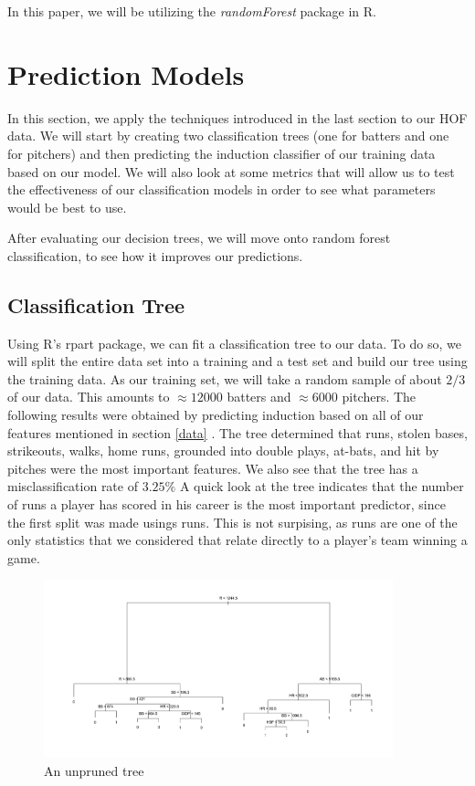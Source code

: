 \documentclass[preprint,12pt]{elsarticle}
\begin{document}
In this paper, we will be utilizing the \textit{randomForest} package in R. 

\section{Prediction Models}

In this section, we apply the techniques introduced in the last section to our HOF data. We will start by creating two classification trees (one for batters and one for pitchers) and then predicting the induction classifier of our training data based on our model. We will also look at some metrics that will allow us to test the effectiveness of our classification models in order to see what parameters would be best to use. 

After evaluating our decision trees, we will move onto random forest classification, to see how it improves our predictions. 

\subsection{Classification Tree}
Using R's rpart package, we can fit a classification tree to our data. To do so, we will split the entire data set into a training and a test set and build our tree using the training data. As our training set, we will take a random sample of about $2/3$ of our data. This amounts to $\approx 12000$ batters and $\approx 6000$ pitchers. The following results were obtained by predicting induction based on all of our features mentioned in section \ref{data} . The tree determined that runs, stolen bases, strikeouts, walks, home runs, grounded into double plays, at-bats, and hit by pitches were the most important features. We also see that the tree has a misclassification rate of $3.25\%$ A quick look at the tree indicates that the number of runs a player has scored in his career is the most important predictor, since the first split was made usings runs. This is not surpising, as runs are one of the only statistics that we considered that relate directly to a player's team winning a game. 
\bigskip

\begin{figure}[h1]
	\centering
	\includegraphics[width=0.9\textwidth]{MachineLearnTree}
	\caption{An unpruned tree}
\end{figure}
\end{document}
